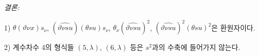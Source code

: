 
\noindent\emph{결론:}

1) $\theta(\vartheta \nu x)s_\nu$, $(\widehat{\vartheta \nu su})(\theta su)s_\nu$, $\theta_\nu(\widehat{\vartheta \nu su})^2$, $(\widehat{\vartheta \nu su})^2(\theta su)^2$은 환원자이다.

2) 계수차수 4의 형식들 $(5,\lambda)$, $(6,\lambda)$ 등은 $s^2$과의 수축에 들어가지 않는다.

